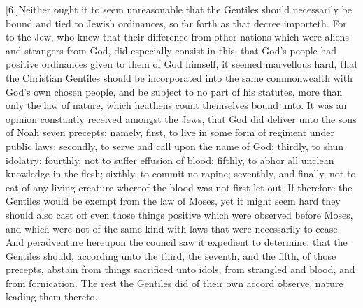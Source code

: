 [6.]Neither ought it to seem unreasonable that the Gentiles should necessarily be bound and tied to Jewish ordinances, so far forth as that decree importeth. For to the Jew, who knew that their difference from other nations which were aliens and strangers from God, did especially consist in this, that God’s people had positive ordinances given to them of God himself, it seemed marvellous hard, that the Christian Gentiles should be incorporated into the same commonwealth with God’s own chosen people, and be subject to no part of his statutes, more than only the law of nature, which heathens count themselves bound unto. It was an opinion constantly received amongst the Jews, that God did deliver unto the sons of Noah seven precepts: namely, first, to live in some form of regiment under public laws; secondly, to serve and call upon the name of God; thirdly, to shun idolatry; fourthly, not to suffer effusion of blood; fifthly, to abhor all unclean knowledge in the flesh; sixthly, to commit no rapine; seventhly, and finally, not to eat of any living creature whereof the blood was not first let out.  If therefore the Gentiles would be exempt from the law of Moses, yet it might seem hard they should also cast off even those things positive which were observed before Moses, and which were not of the same kind with laws that were necessarily to cease. And peradventure hereupon the council saw it expedient to determine, that the Gentiles should, according unto the third, the seventh, and the fifth, of those precepts, abstain from things sacrificed unto idols, from strangled and blood, and from fornication. The rest the Gentiles did of their own accord observe, nature leading them thereto.

